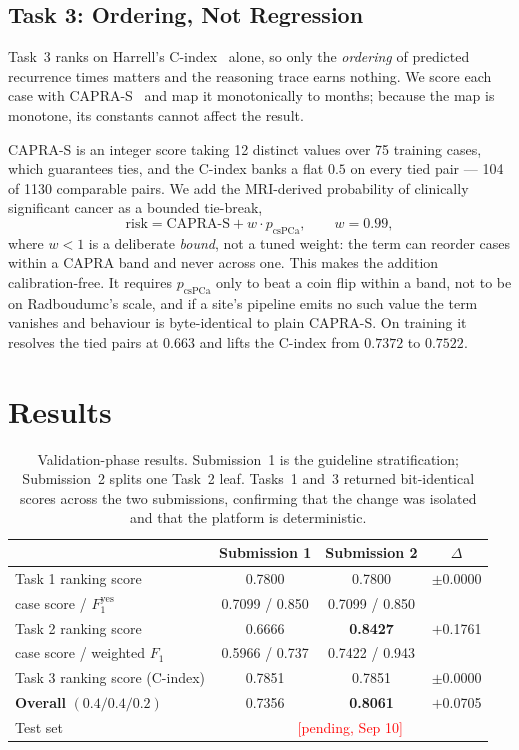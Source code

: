 \documentclass[runningheads]{llncs}
\newcommand{\todo}[1]{\textcolor{red}{[#1]}}
\begin{document}
\subsection{Task 3: Ordering, Not Regression}

Task~3 ranks on Harrell's C-index~\cite{harrell} alone, so only the \emph{ordering}
of predicted recurrence times matters and the reasoning trace earns nothing. We
score each case with CAPRA-S~\cite{capras} and map it monotonically to months;
because the map is monotone, its constants cannot affect the result.

CAPRA-S is an integer score taking 12 distinct values over 75 training cases, which
guarantees ties, and the C-index banks a flat $0.5$ on every tied pair --- 104 of
1130 comparable pairs. We add the MRI-derived probability of clinically significant
cancer as a bounded tie-break,
\begin{equation}
\text{risk} = \text{CAPRA-S} + w \cdot p_{\text{csPCa}}, \qquad w = 0.99 ,
\end{equation}
where $w<1$ is a deliberate \emph{bound}, not a tuned weight: the term can reorder
cases within a CAPRA band and never across one. This makes the addition
calibration-free. It requires $p_{\text{csPCa}}$ only to beat a coin flip within a
band, not to be on Radboudumc's scale, and if a site's pipeline emits no such value
the term vanishes and behaviour is byte-identical to plain CAPRA-S. On training it
resolves the tied pairs at $0.663$ and lifts the C-index from $0.7372$ to $0.7522$.

\section{Results}
\label{sec:results}

\begin{table}[t]
\caption{Validation-phase results. Submission~1 is the guideline stratification;
Submission~2 splits one Task~2 leaf. Tasks~1 and~3 returned bit-identical scores
across the two submissions, confirming that the change was isolated and that the
platform is deterministic.}
\label{tab:val}
\centering
\begin{tabular}{lccc}
\toprule
 & Submission 1 & Submission 2 & $\Delta$ \\
\midrule
Task 1 ranking score      & 0.7800 & 0.7800 & $\pm$0.0000 \\
\quad case score / $F_1^{\text{yes}}$ & 0.7099 / 0.850 & 0.7099 / 0.850 & \\
Task 2 ranking score      & 0.6666 & \textbf{0.8427} & $+$0.1761 \\
\quad case score / weighted $F_1$ & 0.5966 / 0.737 & 0.7422 / 0.943 & \\
Task 3 ranking score (C-index) & 0.7851 & 0.7851 & $\pm$0.0000 \\
\midrule
\textbf{Overall} $(0.4/0.4/0.2)$ & 0.7356 & \textbf{0.8061} & $+$0.0705 \\
\midrule
Test set & \multicolumn{3}{c}{\todo{pending, Sep 10}} \\
\bottomrule
\end{tabular}
\end{table}
\end{document}
